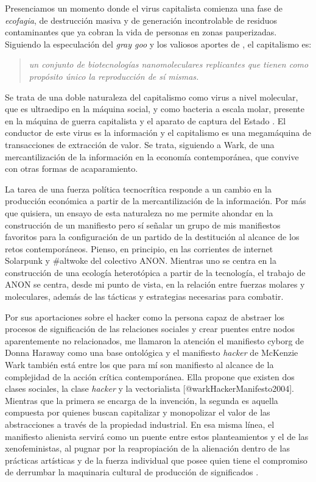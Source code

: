 Presenciamos un momento donde el virus capitalista comienza una fase de \emph{ecofagia}, de destrucción masiva y de generación incontrolable de residuos contaminantes que ya cobran la vida de personas en zonas pauperizadas. Siguiendo la especulación del \emph{gray goo} y los valiosos aportes de \autocite{preciadoTestoYonqui2008}, el capitalismo es:

\begin{quote}
  \emph{un conjunto de biotecnologías nanomoleculares replicantes que tienen como propósito único la reproducción de sí mismas.}
\end{quote}

Se trata de una doble naturaleza del capitalismo como virus a nivel molecular, que es ultraedipo en la máquina social, y como bacteria a escala molar, presente en la máquina de guerra capitalista y el aparato de captura del Estado \autocite{NotesInorganicPart}. El conductor de este virus es la información y el capitalismo es una megamáquina de transacciones de extracción de valor. Se trata, siguiendo a Wark, de una mercantilización de la información en la economía contemporánea, que convive con otras formas de acaparamiento.

La tarea de una fuerza política tecnocrítica responde a un cambio en la producción económica a partir de la mercantilización de la información. Por más que quisiera, un ensayo de esta naturaleza no me permite ahondar en la construcción de un manifiesto pero sí señalar un grupo de mis manifiestos favoritos para la configuración de un partido de la destitución al alcance de los retos contemporáneos. Pienso, en principio, en las corrientes de internet Solarpunk \autocite{SolarpunkNotesManifesto} y \#altwoke del colectivo ANON. Mientras uno se centra en la construcción de una ecología heterotópica a partir de la tecnología, el trabajo de ANON se centra, desde mi punto de vista, en la relación entre fuerzas molares y moleculares, además de las tácticas y estrategias necesarias para combatir.

Por sus aportaciones sobre el hacker como la persona capaz de abstraer los procesos de significación de las relaciones sociales y crear puentes entre nodos aparentemente no relacionados, me llamaron la atención el manifiesto cyborg de Donna Haraway como una base ontológica \autocite{harawayManifiestoParaCyborgs2014} y el manifiesto \emph{hacker} de McKenzie Wark también está entre los que para mí son manifiesto al alcance de la complejidad de la acción crítica contemporánea. Ella propone que existen dos clases sociales, la clase \emph{hacker} y la vectorialista [@warkHackerManifesto2004]. Mientras que la primera se encarga de la invención, la segunda es aquella compuesta por quienes buscan capitalizar y monopolizar el valor de las abstracciones a través de la propiedad industrial. En esa misma línea, el manifiesto alienista servirá como un puente entre estos planteamientos y el de las xenofeministas, al pugnar por la reapropiación de la alienación dentro de las prácticas artísticas y de la fuerza individual que posee quien tiene el compromiso de derrumbar la maquinaria cultural de producción de significados \autocite{dadaistischesseminarALIENIST2017}.

